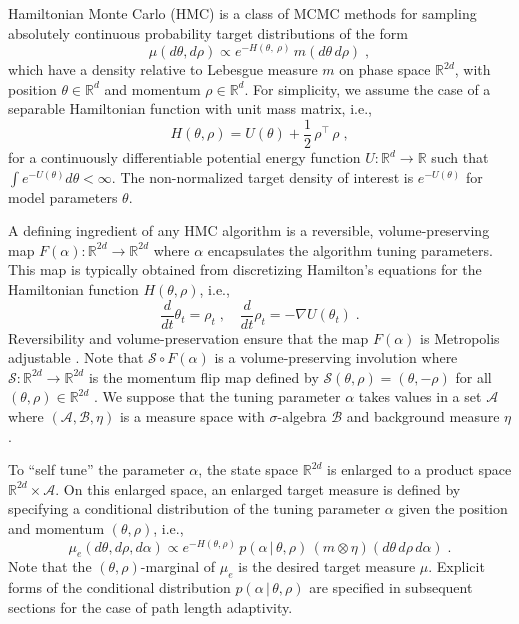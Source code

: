 \documentclass[letterpaper,11pt]{article}
\theoremstyle{plain}%
\theoremstyle{remark}
\begin{document}
\label{sec:sthmc}

Hamiltonian Monte Carlo (HMC) is a class of MCMC methods for sampling absolutely continuous probability target distributions of the form 
\begin{equation} \label{eq:target}
\mu(d\theta, d\rho) \propto e^{-H(\theta,\ \rho)} \, m( d\theta \, d\rho) \;, 
\end{equation}
which have a density relative to Lebesgue measure $m$ on phase space $\mathbb{R}^{2d}$, with position $\theta \in \mathbb{R}^d$ and momentum $\rho \in \mathbb{R}^d.$  For simplicity, we assume  the case of a separable Hamiltonian function with unit mass matrix, i.e., \[
H(\theta,\rho) = U(\theta) + \frac{1}{2} \, \rho^{\top} \, \rho \;, 
\]
for a continuously differentiable potential energy function $U: \mathbb{R}^d \to \mathbb{R}$ such that $\int e^{-U(\theta)} d\theta < \infty$.   The non-normalized target density of interest is $e^{-U(\theta)}$ for model parameters $\theta.$

A defining ingredient of any HMC algorithm is a reversible, volume-preserving map $F(\alpha): \mathbb{R}^{2d} \to \mathbb{R}^{2d}$ where $\alpha$ encapsulates the algorithm tuning parameters.  This map is typically obtained from discretizing Hamilton's equations for the Hamiltonian function $H(\theta,\rho)$, i.e.,  \[
\frac{d}{dt} \theta_t = \rho_t \;, \quad \frac{d}{dt} \rho_t = - \nabla U(\theta_t) \;. 
\] Reversibility and volume-preservation ensure that the map $F(\alpha)$ is Metropolis adjustable \cite{BoSaActaN2018}.  Note that $\mathcal{S} \circ F(\alpha)$ is a volume-preserving involution where $\mathcal{S}: \mathbb{R}^{2d} \to \mathbb{R}^{2d}$ is the momentum flip map defined by $\mathcal{S}(\theta, \rho) = (\theta, -\rho)$ for all $(\theta, \rho) \in \mathbb{R}^{2d}$ \cite{Hairer2010GeometricNumerical}.  We suppose that the tuning parameter $\alpha$
takes values in a set $\mathcal{A}$ where $(\mathcal{A}, \mathcal{B}, \eta)$ is a measure space with $\sigma$-algebra $\mathcal{B}$ and background measure $\eta$.  

To ``self tune''  the parameter $\alpha$, the state space $\mathbb{R}^{2d}$ is enlarged to a product space $\mathbb{R}^{2d} \times \mathcal{A}$. On this enlarged space, an enlarged target measure is defined by specifying a conditional distribution of the tuning parameter $\alpha$ given the position and momentum $(\theta, \rho)$, i.e.,  \begin{equation} \label{eq:enlarged_target}
\mu_e(d\theta, d\rho, d\alpha) \propto  e^{-H(\theta, \rho)} \, p( \alpha \, | \, \theta, \rho) \, (m \otimes \eta) (d\theta \, d\rho  \, d\alpha) \;.
\end{equation}  Note that the $(\theta, \rho)$-marginal of $\mu_e$ is the desired target measure $\mu$.  Explicit forms of the conditional distribution $p( \alpha \, | \, \theta, \rho)$ are specified in subsequent sections for the case of path length adaptivity.  
\end{document}

